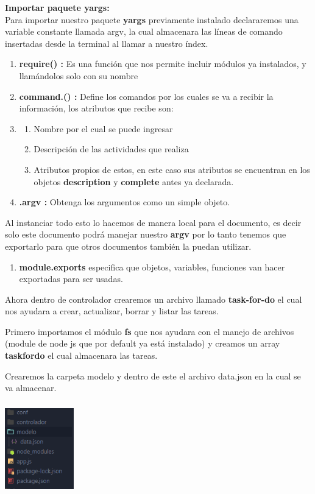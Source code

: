 \documentclass{report}
\begin{document}
\textbf{Importar paquete yargs: }\\
Para importar nuestro paquete \textbf{yargs} previamente instalado declararemos una variable constante llamada argv, la cual almacenara las líneas de comando insertadas desde la terminal al llamar a nuestro índex.

\begin{enumerate}
  \item \textbf{require() : }Es una función que nos permite incluir módulos ya instalados, y llamándolos solo con su nombre
  \item \textbf{command.() : } Define los comandos por los cuales se va a recibir la información, los atributos que recibe son:
  \item \begin{enumerate}
    \item Nombre por el cual se puede ingresar
    \item Descripción de las actividades que realiza
    \item Atributos propios de estos, en este caso sus atributos se encuentran en los objetos \textbf{description} y \textbf{complete} antes ya declarada.
  \end{enumerate}
  \item \textbf{.argv : } Obtenga los argumentos como un simple objeto.
\end{enumerate}

Al instanciar todo esto lo hacemos de manera local para el documento, es decir solo este documento podrá manejar nuestro \textbf{argv} por lo tanto tenemos que exportarlo para que otros documentos también la puedan utilizar.

\begin{enumerate}
  \item \textbf{module.exports{}} especifica que objetos, variables, funciones van hacer exportadas para ser usadas.
\end{enumerate}

Ahora dentro de controlador crearemos un archivo llamado \textbf{task-for-do} el cual nos ayudara a crear, actualizar, borrar y listar las tareas.




Primero importamos el módulo \textbf{fs} que nos ayudara con el manejo de archivos (module de node js que por default ya está instalado) y creamos un array \textbf{taskfordo} el cual almacenara las tareas.

Crearemos la carpeta modelo y dentro de este el archivo data.json en la cual se va almacenar.
\begin{center}
  \includegraphics[width=3cm, height=4cm]{5.png}
\end{center} 
\end{document}
